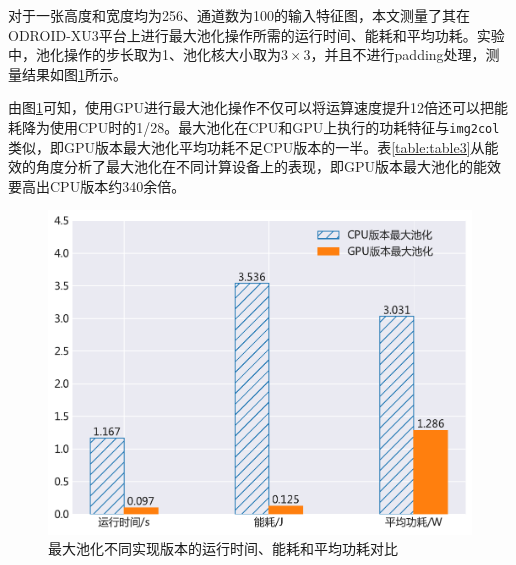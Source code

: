 
对于一张高度和宽度均为256、通道数为100的输入特征图，本文测量了其在ODROID-XU3平台上进行最大池化操作所需的运行时间、能耗和平均功耗。实验中，池化操作的步长取为1、池化核大小取为$3 \times 3$，并且不进行padding处理，测量结果如图\ref{figure:figure12}所示。

由图\ref{figure:figure12}可知，使用GPU进行最大池化操作不仅可以将运算速度提升12倍还可以把能耗降为使用CPU时的1/28。最大池化在CPU和GPU上执行的功耗特征与\texttt{img2col}类似，即GPU版本最大池化平均功耗不足CPU版本的一半。表\ref{table:table3}从能效的角度分析了最大池化在不同计算设备上的表现，即GPU版本最大池化的能效要高出CPU版本约340余倍。

\begin{figure}[htb]
    \begin{center}
    \includegraphics[height=0.4\textwidth]{figures/pool_energy.pdf}
    \end{center}
    \caption{最大池化不同实现版本的运行时间、能耗和平均功耗对比}\label{figure:figure12}
\end{figure}


